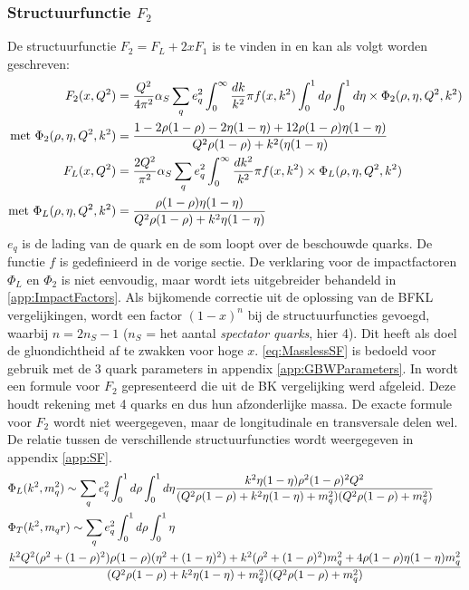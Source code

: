 \documentclass[a4paper,11pt]{article}
\numberwithin{equation}{section} %
\begin{document}
    \subsubsection{Structuurfunctie $F_2$} \label{sec:SF}
De structuurfunctie $F_2 = F_L + 2x F_1$ is te vinden in \cite[vgl. 9.200]{Barone} en kan als volgt worden geschreven:
\begin{align} \label{eq:MasslessSF}
F_2(x,Q^2) &= \frac{Q^2}{4\pi^2} \alpha_S \sum_q e_q^2 \int_0^\infty \frac{dk}{k^2}\pi f(x,k^2) \int_0^1 d\rho \int_0^1 d\eta \times \Phi_2(\rho, \eta, Q^2, k^2) \\
\text{met } \Phi_2(\rho, \eta, Q^2, k^2) &= \frac{1-2\rho(1-\rho)-2\eta(1-\eta)+12\rho(1-\rho)\eta(1-\eta)}{Q^2 \rho(1-\rho) + k^2 (\eta(1-\eta)}\notag \\
F_L(x,Q^2) &= \frac{2 Q^2}{\pi^2} \alpha_S \sum_q e_q^2 \int_0^\infty \frac{dk^2}{k^2} \pi f(x,k^2) \times \Phi_L(\rho, \eta, Q^2, k^2) \\
\text{met } \Phi_L(\rho, \eta, Q^2, k^2) &= \frac{\rho(1-\rho)\eta(1-\eta)}{Q^2 \rho(1-\rho)+k^2 \eta(1-\eta)} \notag
\end{align}
$e_q$ is de lading van de quark en de som loopt over de beschouwde quarks.
De functie $f$ is gedefinieerd in de vorige sectie.
De verklaring voor de impactfactoren $\Phi_L$ en $\Phi_2$ is niet eenvoudig, maar wordt iets uitgebreider behandeld in \ref{app:ImpactFactors}.
Als bijkomende correctie uit de oplossing van de BFKL vergelijkingen, wordt een factor $(1-x)^{n}$ bij de structuurfuncties gevoegd, waarbij $n = 2 n_S -1$ ($n_S$ = het aantal \textit{spectator quarks}, hier 4).
Dit heeft als doel de gluondichtheid af te zwakken voor hoge $x$.
\eqref{eq:MasslessSF} is bedoeld voor gebruik met de 3 quark parameters in appendix \ref{app:GBWParameters}.
In \cite{Bondarenko} wordt een formule voor $F_2$ gepresenteerd die uit de BK vergelijking werd afgeleid.
Deze houdt rekening met 4 quarks en dus hun afzonderlijke massa.
De exacte formule voor $F_2$ wordt niet weergegeven, maar de longitudinale en transversale delen wel.
De relatie tussen de verschillende structuurfuncties wordt weergegeven in appendix \ref{app:SF}.
\begin{align} \label{eq:MassiveSF}
&\Phi_L(k^2, m_q^2) \sim \sum_q e_q^2 \int_0^1 d\rho \int_0^1 d\eta \frac{k^2 \eta(1-\eta)\rho^2(1-\rho)^2 Q^2}{(Q^2\rho(1-\rho)+k^2\eta(1-\eta)+m_q^2)(Q^2\rho(1-\rho)+m_q^2)} \\
&\Phi_T(k^2, m_q^^2) \sim \sum_q e_q^2 \int_0^1 d\rho \int_0^1 \eta \notag \\
&\frac{k^2 Q^2 (\rho^2+(1-\rho)^2)\rho(1-\rho)(\eta^2+(1-\eta)^2)+k^2(\rho^2+(1-\rho)^2)m_q^2 + 4\rho(1-\rho)\eta(1-\eta)m_q^2}{(Q^2\rho(1-\rho)+k^2\eta(1-\eta)+m_q^2)(Q^2\rho(1-\rho)+m_q^2)}
\end{align}
\end{document}
